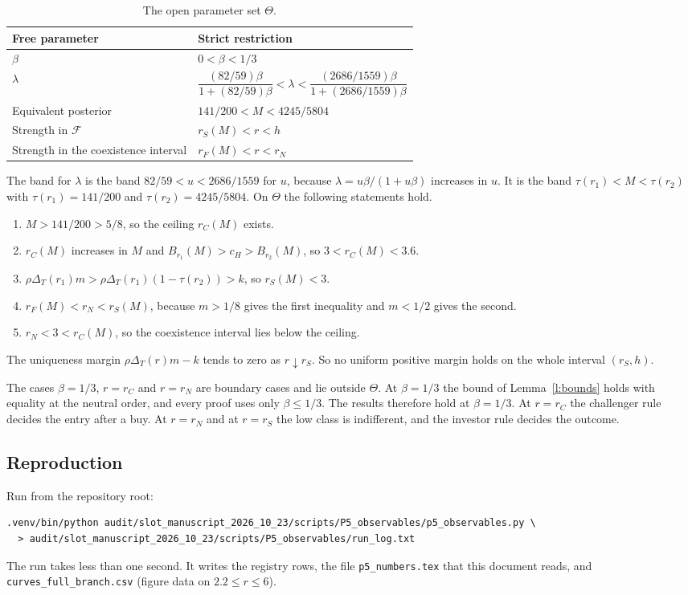 \documentclass[12pt]{article}
\theoremstyle{definition}
\newcommand{\cH}{c_H}
\begin{document}
\begin{table}[H]
\centering\small
\caption{The open parameter set $\Theta$.}\label{tab:theta}
\begin{tabular}{@{}p{4.0cm}p{8.9cm}@{}}
\toprule
Free parameter & Strict restriction\\
\midrule
$\beta$ & $0<\beta<1/3$\\
$\lambda$ & $\dfrac{(82/59)\beta}{1+(82/59)\beta}<\lambda<\dfrac{(2686/1559)\beta}{1+(2686/1559)\beta}$\\
Equivalent posterior & $141/200<M<4245/5804$\\
Strength in $\mathcal F$ & $r_S(M)<r<h$\\
Strength in the coexistence interval & $r_F(M)<r<r_N$\\
\bottomrule
\end{tabular}
\end{table}

The band for $\lambda$ is the band $82/59<u<2686/1559$ for $u$, because $\lambda=u\beta/(1+u\beta)$ increases in $u$.
It is the band $\tau(r_1)<M<\tau(r_2)$ with $\tau(r_1)=141/200$ and $\tau(r_2)=4245/5804$.
On $\Theta$ the following statements hold.
\begin{enumerate}[label=(\alph*)]
\item $M>141/200>5/8$, so the ceiling $r_C(M)$ exists.
\item $r_C(M)$ increases in $M$ and $B_{r_1}(M)>\cH>B_{r_2}(M)$, so $3<r_C(M)<3.6$.
\item $\rho\Delta_T(r_1)m>\rho\Delta_T(r_1)(1-\tau(r_2))>k$, so $r_S(M)<3$.
\item $r_F(M)<r_N<r_S(M)$, because $m>1/8$ gives the first inequality and $m<1/2$ gives the second.
\item $r_N<3<r_C(M)$, so the coexistence interval lies below the ceiling.
\end{enumerate}
The uniqueness margin $\rho\Delta_T(r)m-k$ tends to zero as $r\downarrow r_S$.
So no uniform positive margin holds on the whole interval $(r_S,h)$.

The cases $\beta=1/3$, $r=r_C$ and $r=r_N$ are boundary cases and lie outside $\Theta$.
At $\beta=1/3$ the bound of Lemma~\ref{l:bounds} holds with equality at the neutral order, and every proof uses only $\beta\le1/3$.
The results therefore hold at $\beta=1/3$.
At $r=r_C$ the challenger rule decides the entry after a buy.
At $r=r_N$ and at $r=r_S$ the low class is indifferent, and the investor rule decides the outcome.

\subsection{Reproduction}

Run from the repository root:
\begin{verbatim}
.venv/bin/python audit/slot_manuscript_2026_10_23/scripts/P5_observables/p5_observables.py \
  > audit/slot_manuscript_2026_10_23/scripts/P5_observables/run_log.txt
\end{verbatim}
The run takes less than one second.
It writes the registry rows, the file \texttt{p5\_numbers.tex} that this document reads, and \texttt{curves\_full\_branch.csv} (figure data on $2.2\le r\le6$).
\end{document}
